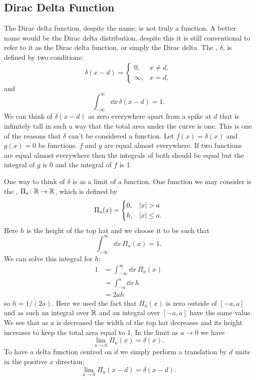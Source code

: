 \documentclass[a4paper]{article}
\begin{document}
    \subsection{Dirac Delta Function}\label{sec:dirac delta}
    The Dirac delta function, despite the name, is not truly a function.
    A better name would be the Dirac delta distribution, despite this it is still conventional to refer to it as the Dirac delta function, or simply the Dirac delta.
    The , \(\delta\), is defined by two conditions:
    \[
        \delta(x - d) = 
        \begin{cases}
            0, &x \ne d,\\
            \infty, & x = d,
        \end{cases}
    \]
    and
   \[\int_{-\infty}^{\infty} \dd x\, \delta(x - d) = 1.\]
    We can think of \(\delta(x - d)\) as zero everywhere apart from a spike at \(d\) that is infinitely tall in such a way that the total area under the curve is one.
    This is one of the reasons that \(\delta\) can't be considered a function.
    Let \(f(x) = \delta(x)\) and \(g(x) = 0\) be functions.
    \(f\) and \(g\) are equal almost everywhere.
    If two functions are equal almost everywhere then the integrals of both should be equal but the integral of \(g\) is \(0\) and the integral of \(f\) is 1.
    
    One way to think of \(\delta\) is as a limit of a function.
    One function we may consider is the , \(\Pi_a\colon\mathbb{R}\to\mathbb{R}\), which is defined by
    \[
        \Pi_a(x) = 
        \begin{cases}
            0, &\abs{x} > a\\
            h, &\abs{x} \le a.
        \end{cases}
    \]
    Here \(h\) is the height of the top hat and we choose it to be such that
    \[\int_{-\infty}^{\infty} \dd x\, \Pi_a(x) = 1.\]
    We can solve this integral for \(h\):
    \begin{align*}
        1 &= \int_{-\infty}^{\infty} \dd x\, \Pi_a(x)\\
        &= \int_{-a}^a \dd x\, h\\
        &= 2ah
    \end{align*}
    so \(h = 1/(2a)\).
    Here we used the fact that \(\Pi_a(x)\) is zero outside of \([-a, a]\) and as such an integral over \(\mathbb{R}\) and an integral over \([-a, a]\) have the same value.
    We see that as \(a\) is decreased the width of the top hat decreases and its height increases to keep the total area equal to 1.
    In the limit as \(a \to 0\) we have
    \[\lim_{a \to 0}\Pi_a(x) = \delta(x).\]
    To have a delta function centred on \(d\) we simply perform a translation by \(d\) units in the positive \(x\) direction:
    \[\lim_{a \to 0}\Pi_a(x - d) = \delta(x - d).\]
    
\end{document}

